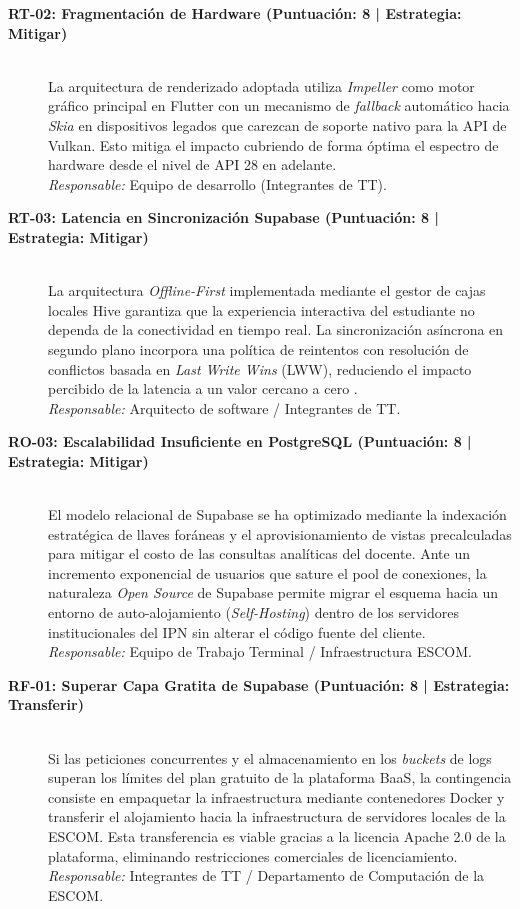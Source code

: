 \begin{description}
    \item[\textbf{RT-02: Fragmentación de Hardware (Puntuación: 8 | Estrategia: Mitigar)}]~\\
    La arquitectura de renderizado adoptada utiliza \textit{Impeller} como motor gráfico principal en Flutter con un mecanismo de \textit{fallback} automático hacia \textit{Skia} en dispositivos legados que carezcan de soporte nativo para la API de Vulkan. Esto mitiga el impacto cubriendo de forma óptima el espectro de hardware desde el nivel de API 28 en adelante. \\
    \textit{Responsable:} Equipo de desarrollo (Integrantes de TT).

    \item[\textbf{RT-03: Latencia en Sincronización Supabase (Puntuación: 8 | Estrategia: Mitigar)}]~\\
    La arquitectura \textit{Offline-First} implementada mediante el gestor de cajas locales Hive garantiza que la experiencia interactiva del estudiante no dependa de la conectividad en tiempo real. La sincronización asíncrona en segundo plano incorpora una política de reintentos con resolución de conflictos basada en \textit{Last Write Wins} (LWW), reduciendo el impacto percibido de la latencia a un valor cercano a cero \cite{supabase2024}. \\
    \textit{Responsable:} Arquitecto de software / Integrantes de TT.

    \item[\textbf{RO-03: Escalabilidad Insuficiente en PostgreSQL (Puntuación: 8 | Estrategia: Mitigar)}]~\\
    El modelo relacional de Supabase se ha optimizado mediante la indexación estratégica de llaves foráneas y el aprovisionamiento de vistas precalculadas para mitigar el costo de las consultas analíticas del docente. Ante un incremento exponencial de usuarios que sature el pool de conexiones, la naturaleza \textit{Open Source} de Supabase permite migrar el esquema hacia un entorno de auto-alojamiento (\textit{Self-Hosting}) dentro de los servidores institucionales del IPN sin alterar el código fuente del cliente.\\
    \textit{Responsable:} Equipo de Trabajo Terminal / Infraestructura ESCOM.

    \item[\textbf{RF-01: Superar Capa Gratita de Supabase (Puntuación: 8 | Estrategia: Transferir)}]~\\
    Si las peticiones concurrentes y el almacenamiento en los \textit{buckets} de logs superan los límites del plan gratuito de la plataforma BaaS, la contingencia consiste en empaquetar la infraestructura mediante contenedores Docker y transferir el alojamiento hacia la infraestructura de servidores locales de la ESCOM. Esta transferencia es viable gracias a la licencia Apache 2.0 de la plataforma, eliminando restricciones comerciales de licenciamiento.\\
    \textit{Responsable:} Integrantes de TT / Departamento de Computación de la ESCOM.
\end{description}

